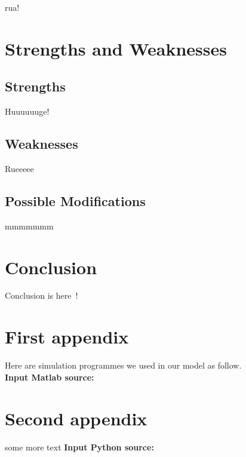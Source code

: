 \documentclass{mcmthesis}
\begin{document}
rua!~~~~

\section{Strengths and Weaknesses}
  \subsection{Strengths}
    Huuuuuuge!
  \subsection{Weaknesses}
    Rueeeee
  \subsection{Possible Modifications}
    mmmmmmm


\section{Conclusion}

Conclusion is here~!


\newpage
%
%




\newpage
\begin{appendices}

  \section{First appendix}

    Here are simulation programmes we used in our model as follow.\\

    \textbf{\textcolor[rgb]{0.98,0.00,0.00}{Input Matlab source:}}


  \section{Second appendix}

    some more text \textcolor[rgb]{0.98,0.00,0.00}{\textbf{Input Python source:}}


\end{appendices}
\end{document}
